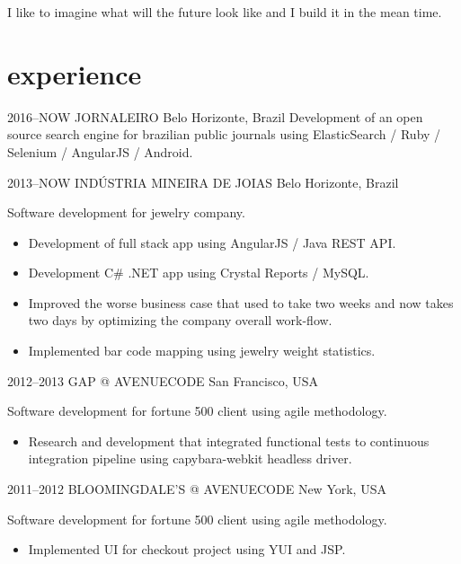 \documentclass[]{friggeri-cv}
\begin{document}
I like to imagine what will the future look like and I build it in the mean time.

\section{experience}
\begin{entrylist}


\entry
{2016--NOW}
{JORNALEIRO}
{Belo Horizonte, Brazil}
{ Development of an open source search engine for brazilian public journals using ElasticSearch / Ruby / Selenium / AngularJS / Android.
}


\entry
{2013--NOW}
{INDÚSTRIA MINEIRA DE JOIAS}
{Belo Horizonte, Brazil}
{ Software development for jewelry company.

  \begin{itemize}
    \item Development of full stack app using AngularJS / Java REST API.
    \item Development C\# .NET app using  Crystal Reports / MySQL.
    \item Improved the worse business case that used to take two weeks and now takes two days by optimizing the company overall work-flow.
    \item Implemented bar code mapping using jewelry weight statistics.
  \end{itemize}
  }


\entry
{2012--2013}
{GAP @ AVENUECODE}
{San Francisco, USA}
{ Software development for fortune 500 client using agile methodology.
  \begin{itemize}
    \item Research and development that integrated functional tests to continuous integration pipeline using capybara-webkit headless driver.
  \end{itemize}
}


\entry
{2011--2012}
{BLOOMINGDALE'S @ AVENUECODE}
{New York, USA}
{ Software development for fortune 500 client using agile methodology.

  \begin{itemize}
    \item Implemented UI for checkout project using YUI and JSP.
  \end{itemize}
}


\end{entrylist}
\end{document}
